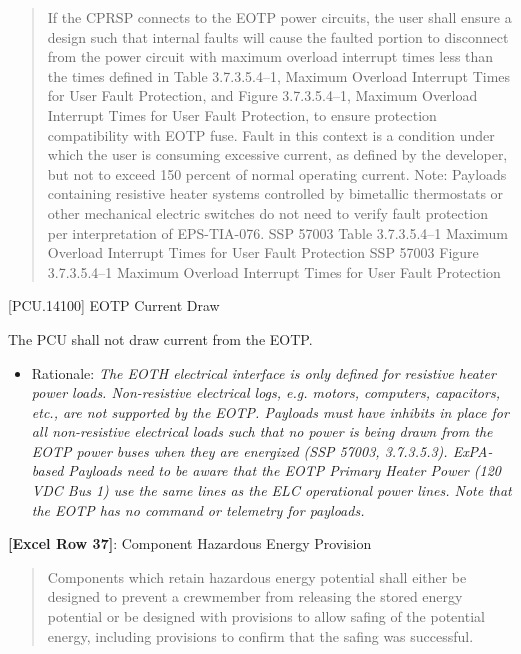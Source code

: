 \begin{quote}
If the CPRSP connects to the EOTP power circuits, the user shall ensure a design such that internal faults will cause the faulted portion to disconnect from the power circuit with maximum overload interrupt times less than the times defined in Table 3.7.3.5.4--1, Maximum Overload Interrupt Times for User Fault Protection, and Figure 3.7.3.5.4--1, Maximum Overload Interrupt Times for User Fault Protection, to ensure protection compatibility with EOTP fuse. Fault in this context is a condition under which the user is consuming excessive current, as defined by the developer, but not to exceed 150 percent of normal operating current.
Note: Payloads containing resistive heater systems controlled by bimetallic thermostats or other mechanical electric switches do not need to verify fault protection per interpretation of EPS-TIA-076.
SSP 57003 Table 3.7.3.5.4--1 Maximum Overload Interrupt Times for User Fault Protection
SSP 57003 Figure 3.7.3.5.4--1 Maximum Overload Interrupt Times for User Fault Protection
\end{quote}

[PCU.14100] EOTP Current Draw

The PCU shall not draw current from the EOTP.

\begin{itemize}
\item{} Rationale: \emph{The EOTH electrical interface is only defined for resistive heater power loads. Non-resistive electrical logs, \emph{e.g.} motors, computers, capacitors, \emph{etc.}, are not supported by the EOTP. Payloads must have inhibits in place for all non-resistive electrical loads such that no power is being drawn from the EOTP power buses when they are energized (SSP 57003, 3.7.3.5.3). ExPA-based Payloads need to be aware that the EOTP Primary Heater Power (120 VDC Bus 1) use the same lines as the ELC operational power lines. Note that the EOTP has no command or telemetry for payloads.}

\end{itemize}

\textbf{[Excel Row 37]}: Component Hazardous Energy Provision

\begin{quote}
Components which retain hazardous energy potential shall either be designed to prevent a crewmember from releasing the stored energy potential or be designed with provisions to allow safing of the potential energy, including provisions to confirm that the safing was successful.
\end{quote}

